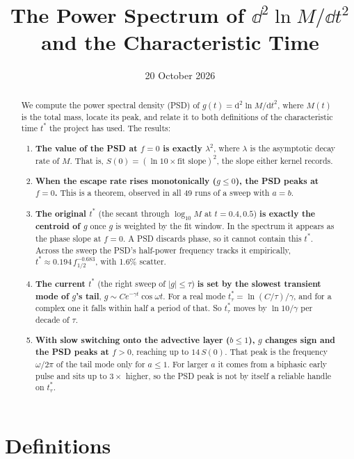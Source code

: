 \documentclass[11pt]{article}
\title{The Power Spectrum of $\dd^2 \ln M/\dd t^2$\\ and the Characteristic Time}
\date{20 October 2026}
\author{}
\newcommand{\dd}{\mathrm{d}}
\begin{document}
\maketitle

\begin{abstract}
\noindent
We compute the power spectral density (PSD) of $g(t) = \dd^2\ln M/\dd t^2$, where
$M(t)$ is the total mass, locate its peak, and relate it to both definitions of the
characteristic time $t^*$ the project has used. The results:
\begin{enumerate}
\item \textbf{The value of the PSD at $f=0$ is exactly $\lambda^2$}, where
  $\lambda$ is the asymptotic decay rate of $M$. That is, $S(0) = (\ln 10 \times
  \text{fit slope})^2$, the slope either kernel records.
\item \textbf{When the escape rate rises monotonically ($g\le 0$), the PSD peaks
  at $f=0$.} This is a theorem, observed in all 49 runs of a sweep with $a=b$.
\item \textbf{The original $t^*$} (the secant through $\log_{10}M$ at $t=0.4,0.5$)
  \textbf{is exactly the centroid of $g$} once $g$ is weighted by the fit window.
  In the spectrum it appears as the phase slope at $f=0$. A PSD discards phase, so
  it cannot contain this $t^*$. Across the sweep the PSD's half-power frequency
  tracks it empirically, $t^*\approx 0.194\,f_{1/2}^{-0.683}$, with 1.6\% scatter.
\item \textbf{The current $t^*$} (the right sweep of $|g|\le\tau$) \textbf{is set
  by the slowest transient mode of $g$'s tail}, $g\sim Ce^{-\gamma t}\cos\omega t$.
  For a real mode $t^*_\tau = \ln(C/\tau)/\gamma$, and for a complex one it falls
  within half a period of that. So $t^*_\tau$ moves by $\ln 10/\gamma$ per decade
  of $\tau$.
\item \textbf{With slow switching onto the advective layer ($b\le1$), $g$ changes
  sign and the PSD peaks at $f>0$}, reaching up to $14\,S(0)$. That peak is the
  frequency $\omega/2\pi$ of the tail mode only for $a\le1$. For larger $a$ it
  comes from a biphasic early pulse and sits up to $3\times$ higher, so the PSD
  peak is not by itself a reliable handle on $t^*_\tau$.
\end{enumerate}
\end{abstract}

\section{Definitions}
\end{document}
